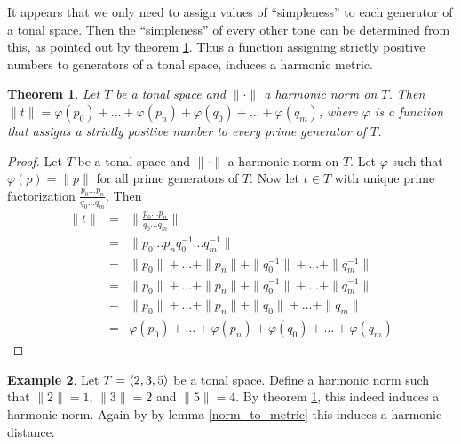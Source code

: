 \documentclass[a4paper]{book}
\newtheorem{theorem}{Theorem}[chapter]
\theoremstyle{definition}
\newtheorem{example}[theorem]{Example}
\begin{document}
It appears that we only need to assign values of ``simpleness'' to each generator of a tonal space.
Then the ``simpleness'' of every other tone can be determined from this, as pointed out by theorem \ref{function_to_harmonic_norm}.
Thus a function assigning strictly positive numbers to generators of a tonal space, induces a harmonic metric.

\begin{theorem}
    Let $T$ be a tonal space and $\| \cdot \|$ a harmonic norm on $T$.
    Then $\|t\| = \varphi(p_0) + \dots + \varphi(p_n) + \varphi(q_0) + \dots + \varphi(q_m)$, where $\varphi$ is a function that assigns a strictly positive number to every prime generator of $T$.
    \label{function_to_harmonic_norm}
\end{theorem}
\begin{proof}
    Let $T$ be a tonal space and $\| \cdot \|$ a harmonic norm on $T$.
    Let $\varphi$ such that $\varphi(p) = \|p\|$ for all prime generators of $T$.
    Now let $t \in T$ with unique prime factorization $\frac{p_0 \dots p_n}{q_0 \dots q_m}$.
    Then 
    \begin{eqnarray*}
        \|t\| &=& \|\frac{p_0 \dots p_n}{q_0 \dots q_m}\| \\
            &=& \|p_0 \dots p_nq_0^{-1} \dots q_m^{-1}\| \\
            &=& \|p_0\|+ \dots + \|p_n\| + \|q_0^{-1}\| + \dots + \|q_m^{-1}\| \\
            &=& \|p_0\|+ \dots + \|p_n\| + \|q_0^{-1}\| + \dots + \|q_m^{-1}\| \\
            &=& \|p_0\|+ \dots + \|p_n\| + \|q_0\| + \dots + \|q_m\|\\
            &=& \varphi(p_0) + \dots + \varphi(p_n) + \varphi(q_0) + \dots + \varphi(q_m)
    \end{eqnarray*}
\end{proof}


\begin{example}
    \label{eulers_formula}
    Let $T = \langle 2,3,5 \rangle$ be a tonal space.
    Define a harmonic norm such that $\|2\| = 1$, $\|3\| = 2$ and $\|5\| = 4$.
    By theorem \ref{function_to_harmonic_norm}, this indeed induces a harmonic norm.
    Again by by lemma \ref{norm_to_metric} this induces a harmonic distance.
\end{example}
\end{document}
